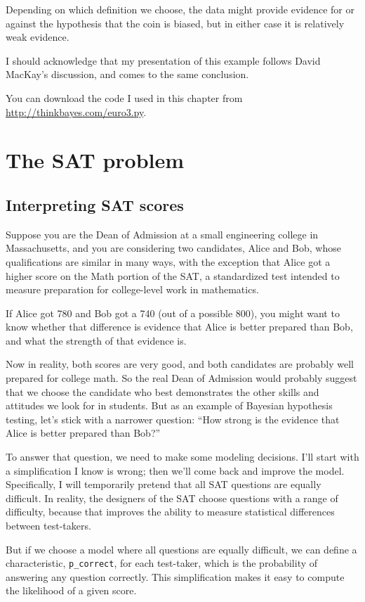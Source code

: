 \documentclass[12pt]{book}
\begin{document}
Depending on which definition we choose, the data might provide
evidence for or against the hypothesis that the coin is biased, but
in either case it is relatively weak evidence.

I should acknowledge that my presentation of this example follows
David MacKay's discussion, and comes to the same conclusion.

You can download the code I used in this chapter from
\url{http://thinkbayes.com/euro3.py}.


\chapter{The SAT problem}

\section{Interpreting SAT scores}

Suppose you are the Dean of Admission at a small engineering
college in Massachusetts, and you are considering two candidates,
Alice and Bob, whose qualifications are similar in many ways,
with the exception that Alice got a higher score on the Math
portion of the SAT, a standardized test intended to measure
preparation for college-level work in mathematics.

If Alice got 780 and Bob got a 740 (out of a possible 800), you might
want to know whether that difference is evidence that Alice is better
prepared than Bob, and what the strength of that evidence is.

Now in reality, both scores are very good, and both 
candidates are probably well prepared for college math.  So
the real Dean of Admission would probably suggest that we choose
the candidate who best demonstrates the other skills and
attitudes we look for in students.  But as an example of
Bayesian hypothesis testing, let's stick with a narrower question:
``How strong is the evidence that Alice is better prepared
than Bob?''

To answer that question, we need to make some modeling decisions.
I'll start with a simplification I know is wrong; then we'll come back
and improve the model.  Specifically, I will temporarily pretend that
all SAT questions are equally difficult.  In reality, the designers of
the SAT choose questions with a range of difficulty, because that
improves the ability to measure statistical differences between
test-takers.

But if we choose a model where all questions are equally difficult, we
can define a characteristic, \verb"p_correct", for each test-taker,
which is the probability of answering any question correctly.  This
simplification makes it easy to compute the likelihood of a given
score.
\end{document}
